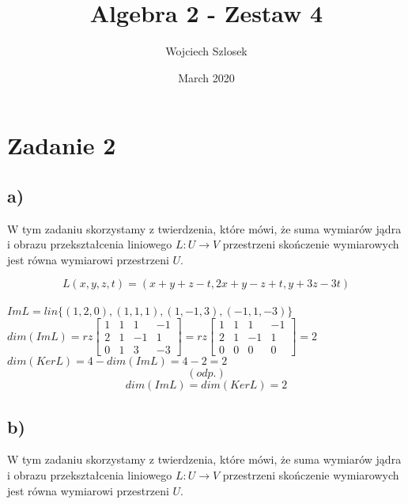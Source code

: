\documentclass{article}
\title{Algebra 2 - Zestaw 4}
\author{Wojciech Szlosek}
\date{March 2020}
\begin{document}
\maketitle

\section{Zadanie 2}

\subsection{a)}

W tym zadaniu skorzystamy z twierdzenia, które mówi, że suma wymiarów jądra i obrazu przekształcenia liniowego $L: U \to V$ przestrzeni skończenie wymiarowych jest równa wymiarowi przestrzeni $U$. \newline 

$$L(x, y, z, t) = (x+y+z-t, 2x+y-z+t, y+3z-3t)$$ \\
$ Im L = lin \{ (1,2,0), (1,1,1), (1,-1,3), (-1,1,-3)\}$ \\ \newline \newline
$dim(Im L) = rz \left[\begin{array}{cccc}
1 & 1 & 1 & -1 \\
2 & 1 & -1 & 1 \\
0 & 1 & 3 & -3 \end{array}\right] = rz \left[\begin{array}{cccc}
1 & 1 & 1 & -1 \\
2 & 1 & -1 & 1 \\
0 & 0 & 0 & 0 \end{array}\right] = 2$ \newline \newline \\
$dim(Ker L) = 4 - dim(Im L) = 4 - 2 = 2$
\newline \newline
$$(odp.)$$ $$ dim(Im L) = dim(Ker L) = 2$$

\subsection{b)}

W tym zadaniu skorzystamy z twierdzenia, które mówi, że suma wymiarów jądra i obrazu przekształcenia liniowego $L: U \to V$ przestrzeni skończenie wymiarowych jest równa wymiarowi przestrzeni $U$. \newline 
\end{document}
